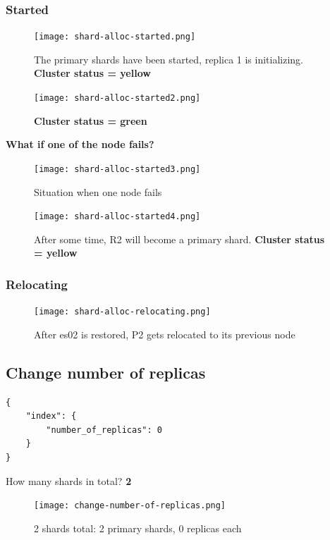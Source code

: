 \documentclass{article}
\begin{document}
\subsubsection{Started}

\begin{figure}[H]
    \centering
    \texttt{[image: shard-alloc-started.png]}
    \caption{The primary shards have been started, replica 1 is initializing. \textbf{Cluster status = yellow}}
\end{figure}
\begin{figure}[H]
    \centering
    \texttt{[image: shard-alloc-started2.png]}
    \caption{\textbf{Cluster status = green}}
\end{figure}

\textbf{What if one of the node fails?}

\begin{figure}[H]
    \centering
    \texttt{[image: shard-alloc-started3.png]}
    \caption{Situation when one node fails}
\end{figure}
\begin{figure}[H]
    \centering
    \texttt{[image: shard-alloc-started4.png]}
    \caption{After some time, R2 will become a primary shard. \textbf{Cluster status = yellow}}
\end{figure}

\subsubsection{Relocating}

\begin{figure}[H]
    \centering
    \texttt{[image: shard-alloc-relocating.png]}
    \caption{After es02 is restored, P2 gets relocated to its previous node}
\end{figure}

\subsection{Change number of replicas}

\begin{verbatim}
{
    "index": {
        "number_of_replicas": 0
    }
}
\end{verbatim}

How many shards in total? \textbf{2}

\begin{figure}[H]
    \centering
    \texttt{[image: change-number-of-replicas.png]}
    \caption{2 shards total: 2 primary shards, 0 replicas each}
\end{figure}
\end{document}
